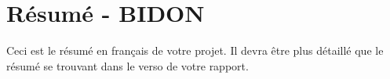 \chapter*{Résumé - BIDON}

Ceci est le résumé en français de votre projet. Il devra être plus détaillé que le résumé se trouvant dans le verso de votre rapport.